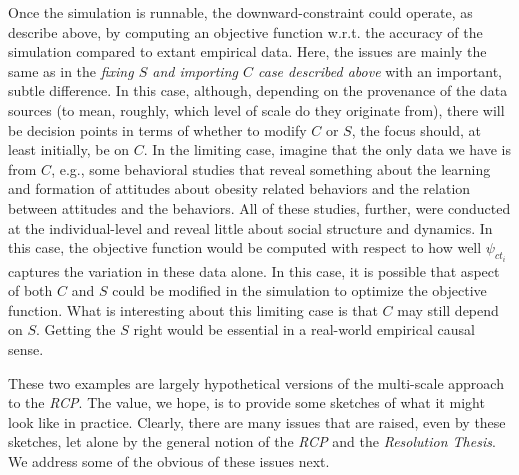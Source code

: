 \documentclass{article}
\begin{document}
Once the simulation is runnable, the downward-constraint could operate, as describe above, by computing an objective function w.r.t. the accuracy of the simulation compared to extant empirical data.  Here, the issues are mainly the same as in the \textit{fixing $S$ and importing $C$ case described above} with an important, subtle difference.  In this case, although, depending on the provenance of the data sources (to mean, roughly, which level of scale do they originate from), there will be decision points in terms of whether to modify $C$ or $S$, the focus should, at least initially, be on $C$.  In the limiting case, imagine that the only data we have is from $C$, e.g., some behavioral studies that reveal something about the learning and formation of attitudes about obesity related behaviors and the relation between attitudes and the behaviors.  All of these studies, further, were conducted at the individual-level and reveal little about social structure and dynamics.  In this case, the objective function would be computed with respect to how well $\psi_{ct_i}$ captures the variation in these data alone.  In this case, it is possible that aspect of both $C$ and $S$ could be modified in the simulation to optimize the objective function.  What is interesting about this limiting case is that $C$ may still depend on $S$.  Getting the $S$ right would be essential in a real-world empirical causal sense.

These two examples are largely hypothetical versions of the multi-scale approach to the \textit{RCP}.  The value, we hope, is to provide some sketches of what it might look like in practice.  Clearly, there are many issues that are raised, even by these sketches, let alone by the general notion of the \textit{RCP} and the \textit{Resolution Thesis}.  We address some of the obvious of these issues next.

\end{document}
